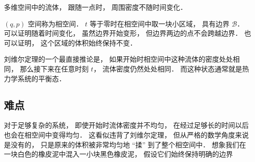 
多维空间中的流体， 跟随一点时， 周围密度不随时间变化．

$(q, p)$ 空间称为相空间． $t$ 等于零时在相空间中取一块小区域， 具有边界 $\mathcal B$． 可以证明随着时间变化， 虽然边界开始变形， 但边界两边的点不会跨越边界． 也可以证明， 这个区域的体积始终保持不变．

刘维尔定理的一个最直接推论是， 如果开始时相空间中这种流体的密度处处相同， 那么接下来在任意时刻 $t$， 流体密度仍然处处相同． 而这种状态通常就是热力学系统的平衡态．

\subsection{难点}
对于足够复杂的系统， 即使开始时流体密度并不均匀， 在经过足够长的时间以后也会在相空间中变得均匀． 这看似违背了刘维尔定理， 但从严格的数学角度来说是没有的， 只是原来的体积被非常均匀地 “揉” 到了整个相空间中． 想象我们在一块白色的橡皮泥中混入一小块黑色橡皮泥， 假设它们始终保持明确的边界
